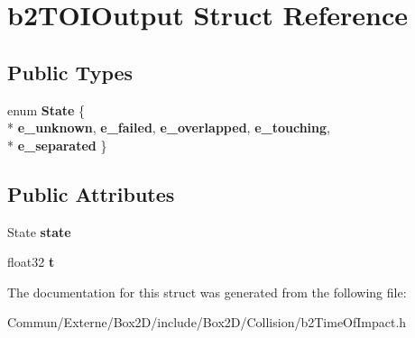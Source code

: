 \hypertarget{structb2_t_o_i_output}{}\section{b2\+T\+O\+I\+Output Struct Reference}
\label{structb2_t_o_i_output}
\subsection*{Public Types}
\begin{DoxyCompactItemize}
\item 
enum {\bfseries State} \{ \\*
{\bfseries e\+\_\+unknown}, 
{\bfseries e\+\_\+failed}, 
{\bfseries e\+\_\+overlapped}, 
{\bfseries e\+\_\+touching}, 
\\*
{\bfseries e\+\_\+separated}
 \}\hypertarget{structb2_t_o_i_output_a12c3cf4dc0551f5c8249dc1dd867959a}{}\label{structb2_t_o_i_output_a12c3cf4dc0551f5c8249dc1dd867959a}

\end{DoxyCompactItemize}
\subsection*{Public Attributes}
\begin{DoxyCompactItemize}
\item 
State {\bfseries state}\hypertarget{structb2_t_o_i_output_aaacbf28f437b965ffecabf1407a77915}{}\label{structb2_t_o_i_output_aaacbf28f437b965ffecabf1407a77915}

\item 
float32 {\bfseries t}\hypertarget{structb2_t_o_i_output_a94f8b756e060892226ec006db4be7ee3}{}\label{structb2_t_o_i_output_a94f8b756e060892226ec006db4be7ee3}

\end{DoxyCompactItemize}


The documentation for this struct was generated from the following file\+:\begin{DoxyCompactItemize}
\item 
Commun/\+Externe/\+Box2\+D/include/\+Box2\+D/\+Collision/b2\+Time\+Of\+Impact.\+h\end{DoxyCompactItemize}
